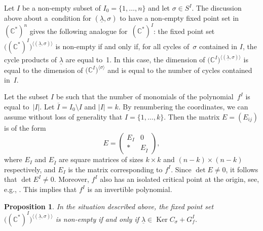 \documentclass[pdftex]{sigma}
\numberwithin{equation}{section}
\newtheorem{Proposition}[Theorem]{Proposition}
 { \theoremstyle{definition}
\newtheorem{Definition}[Theorem]{Definition}
\newtheorem{Remark}[Theorem]{Remark} }
\begin{document}
Let $I$ be a non-empty subset of $I_0=\{1, \dots , n\}$ and let $\sigma \in S^I$. The discussion above about
a~condition for $(\underline{\lambda}, \sigma)$ to have a non-empty fixed point set in $({\mathbb C}^*)^n$ gives the following analogue for~$({\mathbb C}^*)^I$: the fixed point set $\big(({\mathbb C}^*)^I\big)^{\langle (\underline{\lambda}, \sigma) \rangle}$ is non-empty if and only if, for all cycles of~$\sigma$ contained in $I$, the cycle products of $\underline{\lambda}$
are equal to~1. In this case, the dimension of $\big({\mathbb C}^I\big)^{\langle (\underline{\lambda},\sigma) \rangle}$ is equal to the dimension of $\big({\mathbb C}^I\big)^{\langle \sigma \rangle}$ and is equal to the number of cycles contained in~$I$.

Let the subset $I$ be such that the number of monomials of the polynomial~$f^I$ is equal to~$|I|$.
Let $\overline{I}=I_0 \setminus I$ and $|I|=k$. By renumbering the coordinates, we can assume without loss of generality that $I=\{1, \dots , k\}$. Then the matrix $E=(E_{ij})$ is of the form
\[
E = \left( \begin{matrix} E_I & 0 \\ \ast & E_{\overline{I}} \end{matrix} \right),
\]
where $E_I$ and $E_{\overline{I}}$ are square matrices of sizes $k \times k$ and $(n-k) \times (n-k)$ respectively, and $E_I$ is the matrix corresponding to $f^I$. Since $\det E \neq 0$, it follows that $\det E^I \neq 0$. Moreover, $f^I$ also has an isolated critical point at the origin, see, e.g., \cite[Proposition~5]{ET}. This implies that $f^I$ is an invertible polynomial.

\begin{Proposition} \label{prop:fixed_point} In the situation described above, the fixed point set $\big(({\mathbb C}^*)^I\big)^{\langle (\underline{\lambda}, \sigma) \rangle}$
is non-empty if and only if $\underline{\lambda} \in \operatorname{Ker} C_\sigma + G_f^I$.
\end{Proposition}
\end{document}
